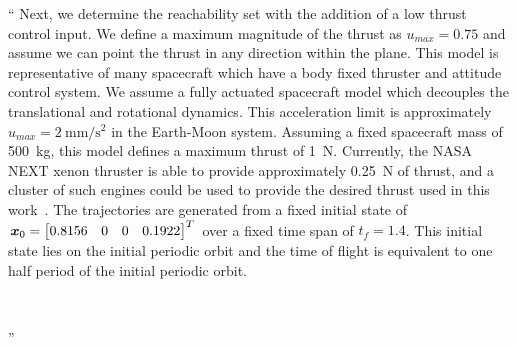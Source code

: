 \documentclass[11pt]{article}
\newenvironment{correction}{\begin{list}{}{\setlength{\leftmargin}{1cm}\setlength{\rightmargin}{1cm}}\vspace{\parsep}\item[]``}{''\end{list}}
\begin{document}
\begin{enumerate}
\begin{correction}
Next, we determine the reachability set with the addition of a low thrust control input.
We define a maximum magnitude of the thrust as \( u_{max} = 0.75 \) and assume we can point the thrust in any direction within the plane. 
This model is representative of many spacecraft which have a body fixed thruster and attitude control system.
We assume a fully actuated spacecraft model which decouples the translational and rotational dynamics.
This acceleration limit is approximately \( u_{max} = \SI{2}{\milli\meter\per\second\squared} \) in the Earth-Moon system.
Assuming a fixed spacecraft mass of \SI{500}{\kilo\gram}, this model defines a maximum thrust of \SI{1}{\newton}.
Currently, the NASA NEXT xenon thruster is able to provide approximately \SI{0.25}{\newton} of thrust, and a cluster of such engines could be used to provide the desired thrust used in this work~\cite{schmidt2008}.
The trajectories are generated from a fixed initial state of \( \bm{x}_0 = \begin{bmatrix}0.8156 & 0 & 0 & 0.1922 \end{bmatrix}^T \) over a fixed time span of \( t_f = 1.4 \).
This initial state lies on the initial periodic orbit and the time of flight is equivalent to one half period of the initial periodic orbit. 
\begin{figure}[H]
    \centering
    ~
\end{figure}
\end{correction}


\end{enumerate}
\end{document}
